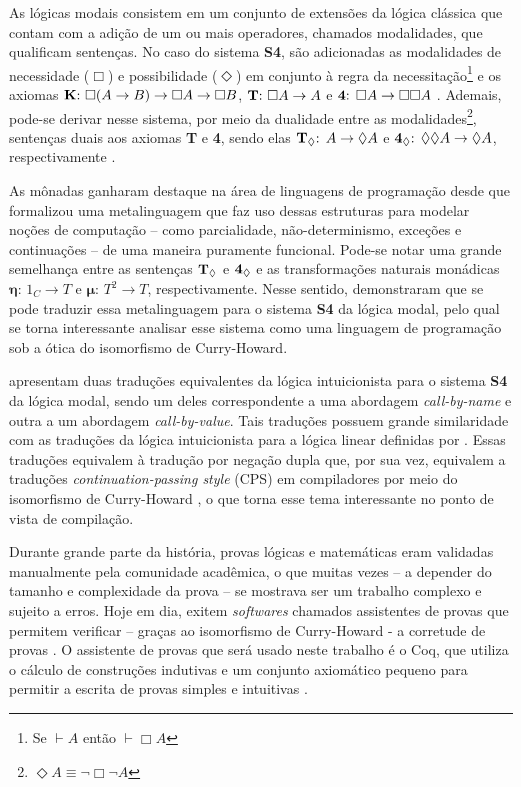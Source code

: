 
As lógicas modais consistem em um conjunto de extensões da lógica clássica que contam com a adição de um ou mais operadores, chamados modalidades, que qualificam sentenças. No caso do sistema \textbf{S4}, são adicionadas as modalidades de necessidade ($\Box$) e possibilidade ($\Diamond$) em conjunto à regra da necessitação\footnote{Se $\vdash A$ então $\vdash \Box A$} e os axiomas $\text{\textbf{K}: } \Box(A \to B) \to \Box A \to \Box B$, $\text{\textbf{T}: } \Box A \to A$ e $\text{\textbf{4}: } \Box A \to \Box \Box A$ \cite{Troelstra}. Ademais, pode-se derivar nesse sistema, por meio da dualidade entre as modalidades\footnote{$\Diamond A \equiv \neg \Box \neg A $}, sentenças duais aos axiomas \textbf{T} e \textbf{4}, sendo elas $\boldsymbol{\text{\textbf{T}}_\Diamond \text{: }} A \to \Diamond A$ e $\boldsymbol{\text{\textbf{4}}_\Diamond \text{: }} \Diamond \Diamond A \to \Diamond A$, respectivamente \cite{Zach}.

As mônadas ganharam destaque na área de linguagens de programação desde que \cite{Moggi1991} formalizou uma metalinguagem que faz uso dessas estruturas para modelar noções de computação -- como parcialidade, não-determinismo, exceções e continuações -- de uma maneira puramente funcional. Pode-se notar uma grande semelhança entre as sentenças $\boldsymbol{\text{\textbf{T}}_\Diamond}$ e $\boldsymbol{\text{\textbf{4}}_\Diamond}$ e as transformações naturais monádicas $\boldsymbol{\eta \text{: }} 1_C \to T$ e $\boldsymbol{\mu \text{: }} T^2 \to T$, respectivamente. Nesse sentido, \cite{Pfenning2001} demonstraram que se pode traduzir essa metalinguagem para o sistema \textbf{S4} da lógica modal, pelo qual se torna interessante analisar esse sistema como uma linguagem de programação sob a ótica do isomorfismo de Curry-Howard.

\cite{Troelstra} apresentam duas traduções equivalentes da lógica intuicionista para o sistema \textbf{S4} da lógica modal, sendo um deles correspondente a uma abordagem \textit{call-by-name} e outra a um abordagem \textit{call-by-value}. Tais traduções possuem grande similaridade com as traduções da lógica intuicionista para a lógica linear definidas por \cite{Girard1987}. Essas traduções equivalem à tradução por negação dupla que, por sua vez, equivalem a traduções \textit{continuation-passing style} (CPS) em compiladores por meio do isomorfismo de Curry-Howard \cite{Reynolds}, o que torna esse tema interessante no ponto de vista de compilação.

Durante grande parte da história, provas lógicas e matemáticas eram validadas manualmente pela comunidade acadêmica, o que muitas vezes -- a depender do tamanho e complexidade da prova -- se mostrava ser um trabalho complexo e sujeito a erros. Hoje em dia, exitem \textit{softwares} chamados assistentes de provas que permitem verificar -- graças ao isomorfismo de Curry-Howard - a corretude de provas \cite{Chlipala}. O assistente de provas que será usado neste trabalho é o Coq, que utiliza o cálculo de construções indutivas e um conjunto axiomático pequeno para permitir a escrita de provas simples e intuitivas \cite{Barras}.

